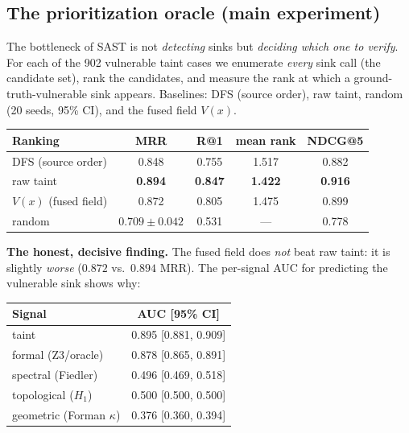 \documentclass[11pt]{article}
\begin{document}
\subsection{The prioritization oracle (main experiment)}
The bottleneck of SAST is not \emph{detecting} sinks but \emph{deciding which one
to verify}. For each of the 902 vulnerable taint cases we enumerate
\emph{every} sink call (the candidate set), rank the candidates, and measure the
rank at which a ground-truth-vulnerable sink appears. Baselines: DFS (source
order), raw taint, random (20 seeds, 95\% CI), and the fused field $V(x)$.

\begin{center}
\small
\begin{tabular}{lcccc}
\toprule
Ranking & MRR & R@1 & mean rank & NDCG@5 \\
\midrule
DFS (source order) & 0.848 & 0.755 & 1.517 & 0.882 \\
raw taint & \textbf{0.894} & \textbf{0.847} & \textbf{1.422} & \textbf{0.916} \\
$V(x)$ (fused field) & 0.872 & 0.805 & 1.475 & 0.899 \\
random & $0.709\pm0.042$ & 0.531 & --- & 0.778 \\
\bottomrule
\end{tabular}
\end{center}

\noindent\textbf{The honest, decisive finding.} The fused field does \emph{not}
beat raw taint: it is slightly \emph{worse} ($0.872$ vs.\ $0.894$ MRR). The
per-signal AUC for predicting the vulnerable sink shows why:

\begin{center}
\small
\begin{tabular}{lc}
\toprule
Signal & AUC [95\% CI] \\
\midrule
taint & 0.895 [0.881, 0.909] \\
formal (Z3/oracle) & 0.878 [0.865, 0.891] \\
spectral (Fiedler) & 0.496 [0.469, 0.518] \\
topological ($H_1$) & 0.500 [0.500, 0.500] \\
geometric (Forman $\kappa$) & 0.376 [0.360, 0.394] \\
\bottomrule
\end{tabular}
\end{center}
\end{document}

